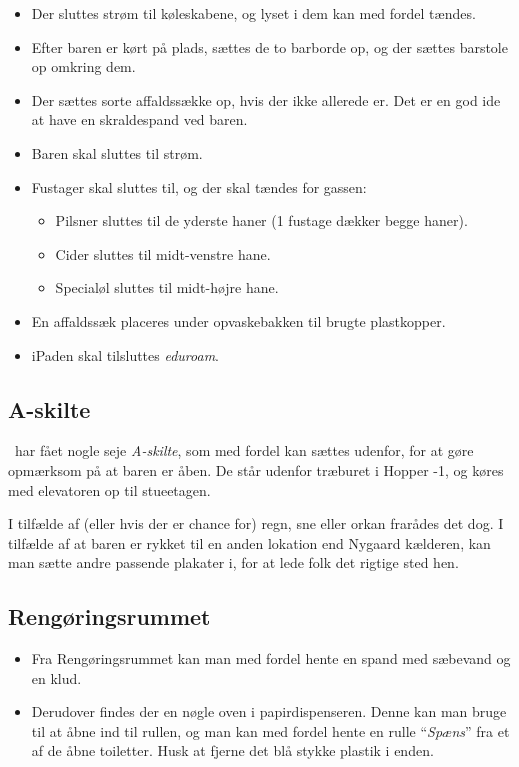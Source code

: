 \begin{itemize}
	\item Der sluttes strøm til køleskabene, og lyset i dem kan med fordel tændes.
	\item Efter baren er kørt på plads, sættes de to barborde op, og der sættes barstole op omkring dem.
	\item Der sættes sorte affaldssække op, hvis der ikke allerede er. 
		Det er en god ide at have en skraldespand ved baren.
	\item Baren skal sluttes til strøm.
	\item Fustager skal sluttes til, og der skal tændes for gassen:
	\begin{itemize}
		\item Pilsner sluttes til de yderste haner (1 fustage dækker begge
		haner).
		\item Cider sluttes til midt-venstre hane.
		\item Specialøl sluttes til midt-højre hane.
	\end{itemize}
	\item En affaldssæk placeres under opvaskebakken til brugte plastkopper.
	\item iPaden skal tilsluttes \textit{eduroam}.
\end{itemize}

\subsection{A-skilte}
\label{sec:pre:a-skilte}
\fredagscafeen\ har fået nogle seje \textit{A-skilte}, 
som med fordel kan sættes udenfor, 
for at gøre opmærksom på at baren er åben.
De står udenfor træburet i Hopper -1, og 
køres med elevatoren op til stueetagen.

I tilfælde af (eller hvis der er chance for) regn, sne eller orkan
frarådes det dog.
I tilfælde af at baren er rykket til en anden lokation end Nygaard kælderen, 
kan man sætte andre passende plakater i, for at lede folk det rigtige sted hen.

\subsection{Rengøringsrummet}
\label{sec:pre:rengøring}
\begin{itemize}
	\item Fra Rengøringsrummet kan man med fordel hente en spand med sæbevand og en klud.
	\item Derudover findes der en nøgle oven i papirdispenseren. Denne kan man bruge til 
	at åbne ind til rullen, og man kan med fordel hente en rulle ``\textit{Spæns}'' 
	fra et af de åbne toiletter. Husk at fjerne det blå stykke plastik i enden.
\end{itemize}